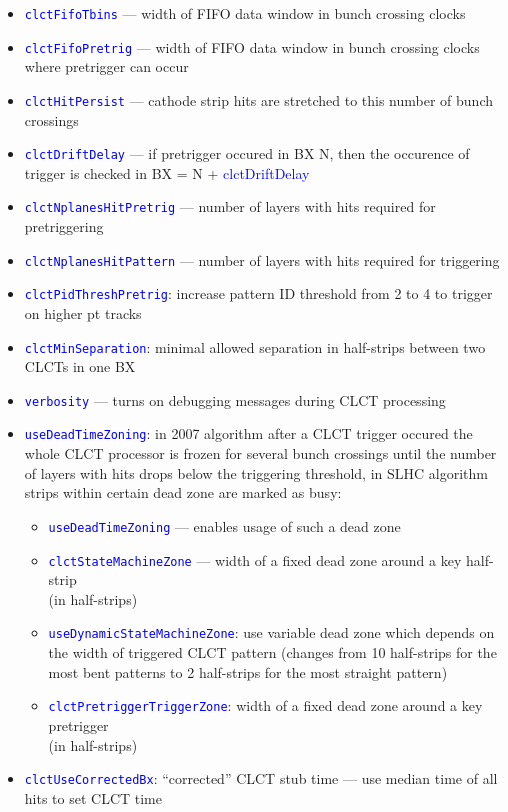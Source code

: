 \begin{itemize}	
  \item \textcolor{blue}{\texttt{clctFifoTbins}} --- width of FIFO data window in bunch crossing clocks
  \item \textcolor{blue}{\texttt{clctFifoPretrig}} --- width of FIFO data window in bunch crossing clocks where pretrigger can occur
  \item \textcolor{blue}{\texttt{clctHitPersist}} --- cathode strip hits are stretched to this number of bunch crossings
  \item \textcolor{blue}{\texttt{clctDriftDelay}} --- if pretrigger occured in BX N, then the occurence of trigger is checked in BX = N + \textcolor{blue}{clctDriftDelay}
  \item \textcolor{blue}{\texttt{clctNplanesHitPretrig}} --- number of layers with hits required for pretriggering
  \item \textcolor{blue}{\texttt{clctNplanesHitPattern}} --- number of layers with hits required for triggering
  \item \textcolor{blue}{\texttt{clctPidThreshPretrig}}: increase pattern ID threshold from 2 to 4 to trigger on higher pt tracks
  \item \textcolor{blue}{\texttt{clctMinSeparation}}: minimal allowed separation in half-strips between two CLCTs in one BX
  \item \textcolor{blue}{\texttt{verbosity}} --- turns on debugging messages during CLCT processing
  \item \textcolor{blue}{\texttt{useDeadTimeZoning}}: in 2007 algorithm after a CLCT trigger occured the whole CLCT processor is frozen for several bunch crossings until the number of layers with hits drops below the triggering threshold, in SLHC algorithm strips within certain dead zone are marked as busy:
  \begin{itemize}
    \item \textcolor{blue}{\texttt{useDeadTimeZoning}} --- enables usage of such a dead zone
    \item \textcolor{blue}{\texttt{clctStateMachineZone}} --- width of a fixed dead zone around a key half-strip \\ (in half-strips)
    \item \textcolor{blue}{\texttt{useDynamicStateMachineZone}}: use variable dead zone which depends on the width of triggered CLCT pattern (changes from 10 half-strips for the most bent patterns to 2 half-strips for the most straight pattern)
    \item \textcolor{blue}{\texttt{clctPretriggerTriggerZone}}: width of a fixed dead zone around a key pretrigger \\ (in half-strips)
  \end{itemize}
  \item \textcolor{blue}{\texttt{clctUseCorrectedBx}}: ``corrected'' CLCT stub time --- use median time of all hits to set CLCT time
\end{itemize}

